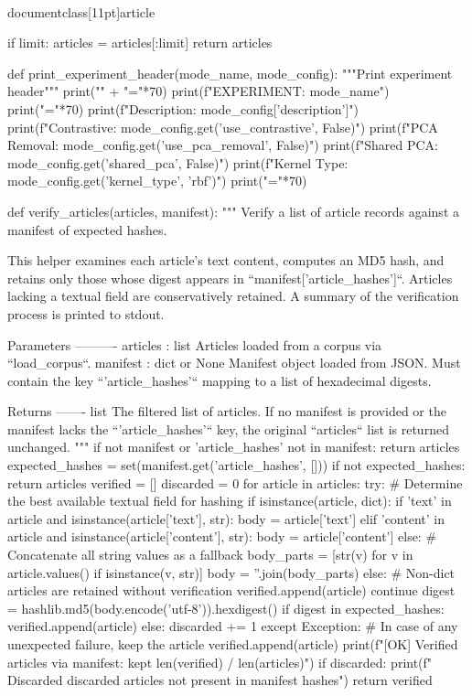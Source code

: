 \\documentclass[11pt]{article}
\begin{document}
\begin{CodeBlock}
    if limit:
        articles = articles[:limit]
    return articles


def print_experiment_header(mode_name, mode_config):
    """Print experiment header"""
    print("\n" + "="*70)
    print(f"EXPERIMENT: {mode_name}")
    print("="*70)
    print(f"Description: {mode_config['description']}")
    print(f"Contrastive: {mode_config.get('use_contrastive', False)}")
    print(f"PCA Removal: {mode_config.get('use_pca_removal', False)}")
    print(f"Shared PCA: {mode_config.get('shared_pca', False)}")
    print(f"Kernel Type: {mode_config.get('kernel_type', 'rbf')}")
    print("="*70)


def verify_articles(articles, manifest):
    """
    Verify a list of article records against a manifest of expected hashes.

    This helper examines each article's text content, computes an MD5 hash,
    and retains only those whose digest appears in ``manifest['article_hashes']``.
    Articles lacking a textual field are conservatively retained. A summary
    of the verification process is printed to stdout.

    Parameters
    ----------
    articles : list
        Articles loaded from a corpus via ``load_corpus``.
    manifest : dict or None
        Manifest object loaded from JSON. Must contain the key
        ``'article_hashes'`` mapping to a list of hexadecimal digests.

    Returns
    -------
    list
        The filtered list of articles. If no manifest is provided or the
        manifest lacks the ``'article_hashes'`` key, the original
        ``articles`` list is returned unchanged.
    """
    if not manifest or 'article_hashes' not in manifest:
        return articles
    expected_hashes = set(manifest.get('article_hashes', []))
    if not expected_hashes:
        return articles
    verified = []
    discarded = 0
    for article in articles:
        try:
            # Determine the best available textual field for hashing
            if isinstance(article, dict):
                if 'text' in article and isinstance(article['text'], str):
                    body = article['text']
                elif 'content' in article and isinstance(article['content'], str):
                    body = article['content']
                else:
                    # Concatenate all string values as a fallback
                    body_parts = [str(v) for v in article.values() if isinstance(v, str)]
                    body = ''.join(body_parts)
            else:
                # Non-dict articles are retained without verification
                verified.append(article)
                continue
            digest = hashlib.md5(body.encode('utf-8')).hexdigest()
            if digest in expected_hashes:
                verified.append(article)
            else:
                discarded += 1
        except Exception:
            # In case of any unexpected failure, keep the article
            verified.append(article)
    print(f"[OK] Verified articles via manifest: kept {len(verified)} / {len(articles)}")
    if discarded:
        print(f"  Discarded {discarded} articles not present in manifest hashes")
    return verified



\end{CodeBlock}
\end{document}
